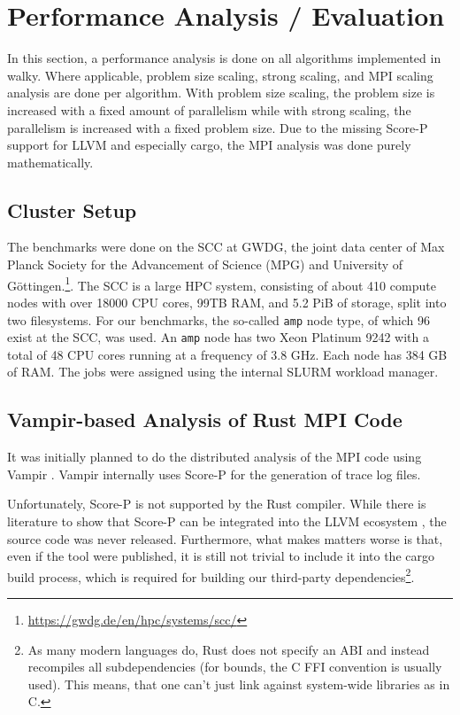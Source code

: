 \section{Performance Analysis / Evaluation}

In this section, a performance analysis is done on all algorithms implemented in walky. Where applicable, problem size scaling, strong scaling, and \ac{MPI} scaling analysis are done per algorithm. With problem size scaling, the problem size is increased with a fixed amount of parallelism while with strong scaling, the parallelism is increased with a fixed problem size. Due to the missing Score-P support for LLVM and especially cargo, the \ac{MPI} analysis was done purely mathematically.
\subsection{Cluster Setup}

The benchmarks were done on the \ac{SCC} at GWDG, the joint data center of Max Planck Society for the Advancement of Science (MPG) and University of Göttingen.\footnote{\href{https://gwdg.de/en/hpc/systems/scc/}{\url{https://gwdg.de/en/hpc/systems/scc/}}}. The \ac{SCC} is a large \ac{HPC} system, consisting of about 410 compute nodes with over 18000 CPU cores, 99TB RAM, and 5.2 PiB of storage, split into two filesystems.
For our benchmarks, the so-called \texttt{amp} node type, of which 96 exist at the \ac{SCC}, was used. An \texttt{amp} node has two Xeon Platinum 9242 with a total of 48 CPU cores running at a frequency of 3.8 GHz. Each node has 384 GB of RAM. The jobs were assigned using the internal SLURM workload manager.

\subsection{Vampir-based Analysis of Rust \acs{MPI} Code}

It was initially planned to do the distributed analysis of the \ac{MPI} code using Vampir \cite{noauthor_vampir_nodate}.
Vampir internally uses Score-P \cite{brunst_score-p_2012} for the generation of trace log files. 

Unfortunately, Score-P is not supported by the Rust compiler.
While there is literature to show that Score-P can be integrated into the \acs{LLVM} ecosystem \cite{tschuter_llvm_2017}, the source code was never released.
Furthermore, what makes matters worse is that, even if the tool were published, it is still not trivial to include it into
the cargo build process, which is required for building our third-party dependencies\footnote{As many modern languages do, 
Rust does not specify an \ac{ABI} and instead recompiles all subdependencies (for bounds, the C 
\ac{FFI} convention is usually used). This means, that one can't just link against system-wide libraries as in C.}.

